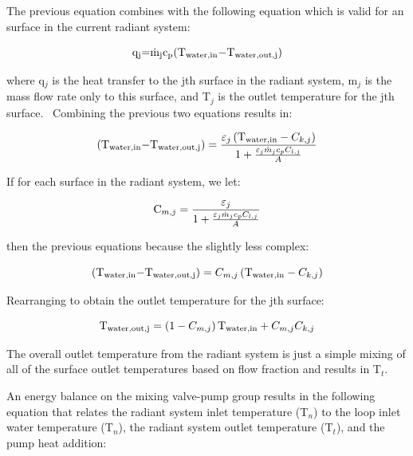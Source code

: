 The previous equation combines with the following equation which is valid for an surface in the current radiant system:

\begin{equation}
{{\rm{q}}_{\rm{j}}}{\rm{  =  }}{{\rm{\dot m}}_{\rm{j}}}{{\rm{c}}_{\rm{p}}}{\rm{(}}{{\rm{T}}_{{\rm{water,in}}}}{\rm{  -  }}{{\rm{T}}_{{\rm{water,out,j}}}}{\rm{)}}
\end{equation}

where q\(_{j}\) is the heat transfer to the jth surface in the radiant system, m\(_{j}\) is the mass flow rate only to this surface, and T\(_{j}\) is the outlet temperature for the jth surface.~ Combining the previous two equations results in:

\begin{equation}
{\rm{(}}{{\rm{T}}_{{\rm{water,in}}}}{\rm{  -  }}{{\rm{T}}_{{\rm{water,out,j}}}}{\rm{)}} = \frac{{{\varepsilon_j}\left( {{{\rm{T}}_{{\rm{water,in}}}} - {C_{k,j}}} \right)}}{{1 + \frac{{{\varepsilon_j}{{\dot m}_j}{c_p}{C_{l,j}}}}{A}}}
\end{equation}

If for each surface in the radiant system, we let:

\begin{equation}
{{\rm{C}}_{m,j}} = \frac{{{\varepsilon_j}}}{{1 + \frac{{{\varepsilon_j}{{\dot m}_j}{c_p}{C_{l,j}}}}{A}}}
\end{equation}

then the previous equations because the slightly less complex:

\begin{equation}
{\rm{(}}{{\rm{T}}_{{\rm{water,in}}}}{\rm{  -  }}{{\rm{T}}_{{\rm{water,out,j}}}}{\rm{)}} = {C_{m,j}}\left( {{{\rm{T}}_{{\rm{water,in}}}} - {C_{k,j}}} \right)
\end{equation}

Rearranging to obtain the outlet temperature for the jth surface:

\begin{equation}
{{\rm{T}}_{{\rm{water,out,j}}}} = \left( {1 - {C_{m,j}}} \right){{\rm{T}}_{{\rm{water,in}}}} + {C_{m,j}}{C_{k,j}}
\end{equation}

The overall outlet temperature from the radiant system is just a simple mixing of all of the surface outlet temperatures based on flow fraction and results in T\(_{t}\).

An energy balance on the mixing valve-pump group results in the following equation that relates the radiant system inlet temperature (T\(_{n}\)) to the loop inlet water temperature (T\(_{n}\)), the radiant system outlet temperature (T\(_{t}\)), and the pump heat addition:

